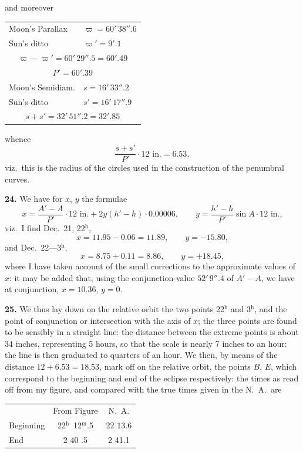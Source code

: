 \documentclass[11pt,a4paper]{article}
\begin{document}
and moreover
\begin{center}
\begin{tabular}{ll}
Moon's Parallax & $\varpi = 60'\,38''.6$ \\
Sun's ditto & $\varpi' = 9'.1$ \\
\multicolumn{2}{c}{$\varpi - \varpi' = 60'\,29''.5 = 60'.49$} \\
\multicolumn{2}{c}{$P' = 60'.39$} \\
Moon's Semidiam. & $s = 16'\,33''.2$ \\
Sun's ditto & $s' = 16'\,17''.9$ \\
\multicolumn{2}{c}{$s + s' = 32'\,51''.2 = 32'.85$} \\
\end{tabular}
\end{center}

whence
\[
\frac{s+s'}{P'} \cdot 12 \text{ in.} = 6.53,
\]
viz.\ this is the radius of the circles used in the construction of the penumbral curves.

\noindent\textbf{24.} We have for $x$, $y$ the formulae
\[
x = \frac{A' - A}{P'} \cdot 12 \text{ in.} + 2y(h'-h) \cdot 0.00006, \qquad y = \frac{h'-h}{P'} \sin A \cdot 12 \text{ in.},
\]
viz.\ I find Dec.\ 21, 22$^{\text{h}}$,
\[
x = 11.95 - 0.06 = 11.89, \qquad y = -15.80,
\]
and Dec.\ 22---3$^{\text{h}}$,
\[
x = 8.75 + 0.11 = 8.86, \qquad y = +18.45,
\]
where I have taken account of the small corrections to the approximate values of $x$: it may be added that, using the conjunction-value $52'\,9''.4$ of $A' - A$, we have at conjunction, $x = 10.36$, $y = 0$.

\noindent\textbf{25.} We thus lay down on the relative orbit the two points 22$^{\text{h}}$ and 3$^{\text{h}}$, and the point of conjunction or intersection with the axis of $x$; the three points are found to be sensibly in a straight line: the distance between the extreme points is about 34 inches, representing 5 hours, so that the scale is nearly 7 inches to an hour: the line is then graduated to quarters of an hour. We then, by means of the distance $12 + 6.53 = 18.53$, mark off on the relative orbit, the points $B$, $E$, which correspond to the beginning and end of the eclipse respectively: the times as read off from my figure, and compared with the true times given in the N.\ A.\ are

\begin{center}
\begin{tabular}{lcc}
 & From Figure & N.\ A. \\
Beginning & 22$^{\text{h}}$\ 12$^{\text{m}}$.5 & 22 13.6 \\
End & 2 40 .5 & 2 41.1 \\
\end{tabular}
\end{center}
\end{document}
